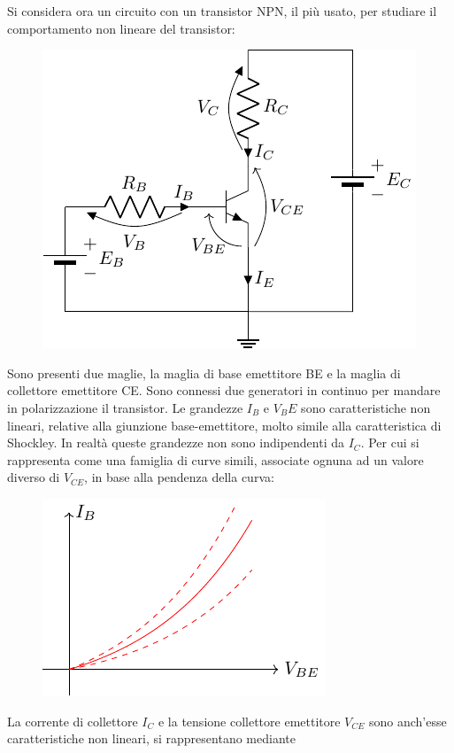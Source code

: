 \documentclass{article}
\numberwithin{equation}{subsection}
\begin{document}
Si considera ora un circuito con un transistor NPN, il più usato, per studiare il comportamento non lineare del transistor:
\begin{figure}[H]%
    \centering    
    \includegraphics{circuito-bjt.pdf}%
    \label{fig:circuito-bjt}
\end{figure}
Sono presenti due maglie, la maglia di base emettitore BE e la maglia di collettore emettitore CE. Sono connessi due generatori in continuo per mandare 
in polarizzazione il transistor. 
Le grandezze $I_B$ e $V_BE$ sono caratteristiche non lineari, relative alla giunzione base-emettitore, molto simile alla caratteristica di Shockley. In realtà queste 
grandezze non sono indipendenti da $I_C$. Per cui si rappresenta come una famiglia di curve simili, associate ognuna ad un valore diverso di $V_{CE}$, in base 
alla pendenza della curva:
\begin{figure}[H]%
    \centering
    \includegraphics{andamento-base.pdf}%
    \label{fig:andamento-base}
\end{figure}
La corrente di collettore $I_C$ e la tensione collettore emettitore $V_{CE}$ sono anch'esse caratteristiche non lineari, si rappresentano mediante 
\end{document}
